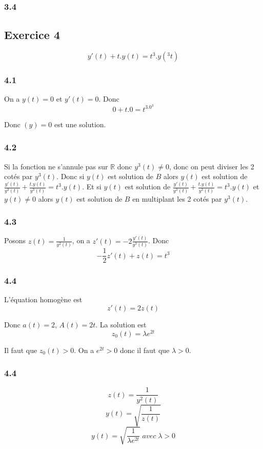 \documentclass[]{book}
\theoremstyle{definition}
\newcommand{\bb}[1]{\mathbb{#1}}
\newcommand{\R}{\bb{R}}
\begin{document}
\subsubsection*{3.4}


\subsection*{Exercice 4}
$$y'(t) + t.y(t) = t^3.y(^3t)$$
\subsubsection*{4.1}
On a $y(t) = 0$ et $y'(t) = 0$.
Donc
$$0 + t.0 = t^3.0^3$$

Donc $(y) = 0$ est une solution.

\subsubsection*{4.2}
Si la fonction ne s'annule pas sur $\R$ donc $y^3(t) \neq 0$, donc on peut diviser les 2 cot\'es par $y^3(t)$. Donc si $y(t)$ est solution de $B$ alors $y(t)$ est solution de $\frac{y'(t)}{y^3(t)} + \frac{t.y(t)}{y^3(t)} = t^3.y(t)$. Et si $y(t)$ est solution de $\frac{y'(t)}{y^3(t)} + \frac{t.y(t)}{y^3(t)} = t^3.y(t)$ et $y(t) \neq 0$ alors $y(t)$ est solution de $B$ en multiplant les 2 cot\'es par $y^3(t)$.


\subsubsection*{4.3}
Posons $z(t) = \frac{1}{y^2(t)}$, on a $z'(t) = -2\frac{y'(t)}{y^3(t)}$. Donc
$$-\frac{1}{2}z'(t) + z(t) = t^3$$

\subsubsection*{4.4}
L'\'equation homog\`ene est
$$z'(t) = 2z(t) $$

Donc $a(t) = 2$, $A(t) = 2t$. La solution est 
$$z_0(t) = \lambda e^{2t}$$

Il faut que $z_0(t) > 0$. On a $e^{2t} > 0$ donc il faut que $\lambda > 0$.

\subsubsection*{4.4}
$$z(t) = \frac{1}{y^2(t)}$$
$$y(t) = \sqrt{\frac{1}{z(t)}}$$
$$y(t) = \sqrt{\frac{1}{\lambda e^{2t}}}\; avec\; \lambda > 0$$
\end{document}
